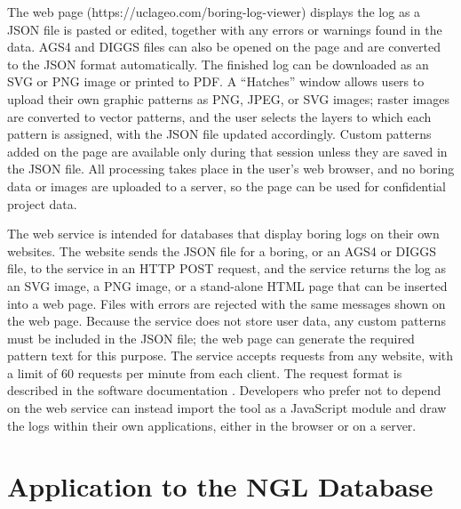 \documentclass[Journal,letterpaper,InsideFigs]{ascelike-new}
\begin{document}
The web page (https://uclageo.com/boring-log-viewer) displays the log as a JSON file is pasted or edited, together with any errors or warnings found in the data. AGS4 and DIGGS files can also be opened on the page and are converted to the JSON format automatically.  The finished log can be downloaded as an SVG or PNG image or printed to PDF. A ``Hatches'' window allows users to upload their own graphic patterns as PNG, JPEG, or SVG images; raster images are converted to vector patterns, and the user selects the layers to which each pattern is assigned, with the JSON file updated accordingly. Custom patterns added on the page are available only during that session unless they are saved in the JSON file. All processing takes place in the user's web browser, and no boring data or images are uploaded to a server, so the page can be used for confidential project data.

The web service is intended for databases that display boring logs on their own websites. The website sends the JSON file for a boring, or an AGS4 or DIGGS file, to the service in an HTTP POST request, and the service returns the log as an SVG image, a PNG image, or a stand-alone HTML page that can be inserted into a web page.  Files with errors are rejected with the same messages shown on the web page. Because the service does not store user data, any custom patterns must be included in the JSON file; the web page can generate the required pattern text for this purpose. The service accepts requests from any website, with a limit of 60 requests per minute from each client. The request format is described in the software documentation \cite{BrandenbergSahin2026}. Developers who prefer not to depend on the web service can instead import the tool as a JavaScript module and draw the logs within their own applications, either in the browser or on a server.

\section{Application to the NGL Database}
\end{document}
